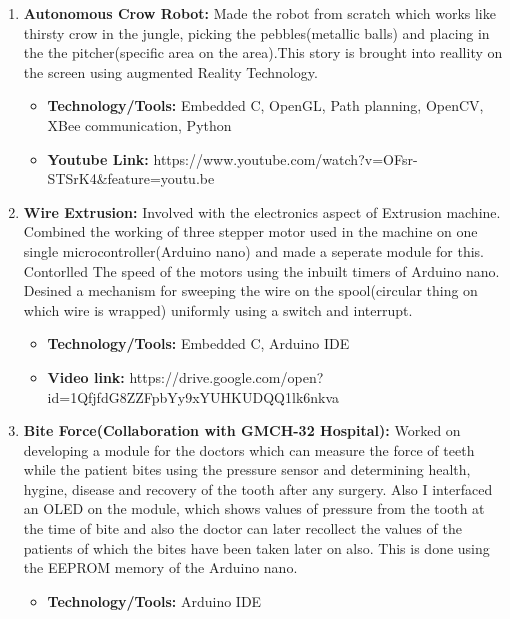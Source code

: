 \documentclass[letterpaper,11pt]{article}
\newlength{\outerbordwidth}
\newcommand{\resheading}[1]{\vspace{8pt}
  \parbox{\textwidth}{\setlength{\FrameSep}{\outerbordwidth}
    \begin{shaded}
\setlength{\fboxsep}{0pt}\framebox[\textwidth][l]{\setlength{\fboxsep}{4pt}\fcolorbox{shadecolorB}{shadecolorB}{\textbf{\sffamily{\mbox{~}\makebox[6.762in][l]{\large #1} \vphantom{p\^{E}}}}}}
    \end{shaded}
  }\vspace{-5pt}
}
\begin{document}
\resheading{Projects}
 \begin{enumerate}

\item \textbf {Autonomous Crow Robot:}
Made the robot from scratch which works like thirsty crow in the jungle, picking the pebbles(metallic balls) and placing in the the pitcher(specific area on the area).This story is brought into reallity on the screen using augmented Reality Technology. 
\begin{itemize}
\item \textbf{Technology/Tools:} Embedded C, OpenGL, Path planning, OpenCV, XBee communication, Python 
\end{itemize}
\begin{itemize}
\item \textbf{Youtube Link:} https://www.youtube.com/watch?v=OFsr-STSrK4&feature=youtu.be
\end{itemize}

\item \textbf {Wire Extrusion:}
Involved with the electronics aspect of Extrusion machine. Combined the working of three stepper motor used in the machine on one single microcontroller(Arduino nano) and made a seperate module for this. Contorlled The speed of the motors using the inbuilt timers of Arduino nano. Desined a mechanism for sweeping the wire on the spool(circular thing on which wire is wrapped) uniformly using a switch and interrupt. 

\begin{itemize}
\item \textbf{Technology/Tools:} Embedded C, Arduino IDE
\end{itemize}
\begin{itemize}
\item \textbf{Video link:} https://drive.google.com/open?id=1QfjfdG8ZZFpbYy9xYUHKUDQQ1lk6nkva
\end{itemize}

 
  \item \textbf{Bite Force(Collaboration with GMCH-32 Hospital):} 
Worked on developing a module for the doctors which can measure the force of teeth while the patient bites using the pressure sensor and determining  health, hygine, disease and recovery of the tooth after any surgery. Also I interfaced an OLED on the module, which shows values of pressure from the tooth at the time of bite and also the doctor can later recollect the values of the patients of which the bites have been taken later on also. This is done using the EEPROM memory of the Arduino nano.
\begin{itemize}
\item \textbf{Technology/Tools:} Arduino IDE
\end{itemize}


\end{enumerate}
\end{document}
